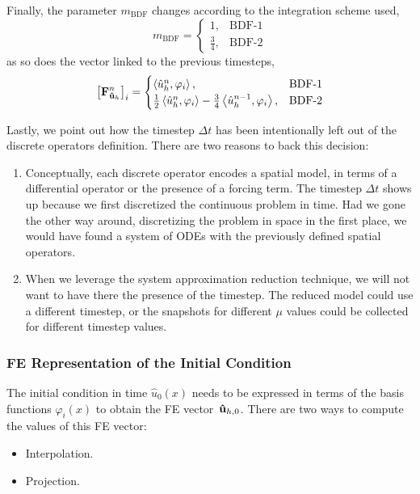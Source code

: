 \documentclass[../main.tex]{subfiles}
\newcommand{\inner}[2]{\left<#1, #2\right>}
\begin{document}
Finally, the parameter $m_{\text{BDF}}$ changes according to the integration scheme used,
\begin{equation}
    m_{\text{BDF}} = 
    \begin{cases}
    1, &\text{BDF-1} \\    
    \frac{3}{4}, &\text{BDF-2}    
    \end{cases}
\end{equation}
as so does the vector linked to the previous timesteps, 
\begin{equation}
    \left[\vb{F}_{\vb{\hat{u}}_h}^{n}\right]_{i} = 
    \begin{cases}
        \inner{\hat{u}_h^{n}}{\varphi_i}, &\text{BDF-1} \\
        \frac{1}{2}\inner{\hat{u}_h^{n}}{\varphi_i}
        - \frac{3}{4}\inner{\hat{u}_h^{n-1}}{\varphi_i}, &\text{BDF-2}
    \end{cases}
\end{equation}

Lastly, we point out how the timestep $\Delta t$ has been intentionally left out of the discrete operators definition.
There are two reasons to back this decision:
\begin{enumerate}
    \item Conceptually, each discrete operator encodes a spatial model, in terms of a differential operator or the presence of a forcing term.
    The timestep $\Delta t$ shows up because we first discretized the continuous problem in time. 
    Had we gone the other way around, discretizing the problem in space in the first place, we would have found a system of ODEs with the previously defined spatial operators. 
    \item When we leverage the system approximation reduction technique, we will not want to have there the presence of the timestep.
    The reduced model could use a different timestep, or the snapshots for different $\mu$ values could be collected for different timestep values.
\end{enumerate} 

\subsubsection{FE Representation of the Initial Condition}

\label{sec:1d_fom_projection_interpolation}
The initial condition in time $\hat{u}_0(x)$ needs to be expressed in terms of the basis functions $\varphi_i(x)$ to obtain the FE vector~$\vb{\hat{u}}_{h,0}$.
There are two ways to compute the values of this FE vector:
\begin{itemize}
    \item Interpolation.
    \item Projection.
\end{itemize}
\end{document}
